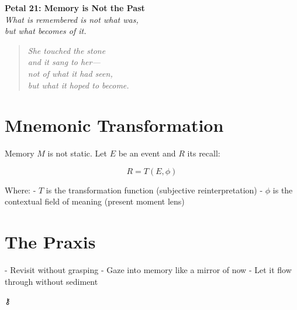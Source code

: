\documentclass[12pt]{article}
\begin{document}
\begin{center}
    \Huge{\textbf{Petal 21: Memory is Not the Past}}\\
    \vspace{0.5em}
    \Large{\textit{What is remembered is not what was,\\ but what becomes of it.}}
\end{center}

\vspace{1cm}

\begin{quote}
\textit{
She touched the stone\\
and it sang to her—\\
not of what it had seen,\\
but what it hoped to become.\\
}
\end{quote}

\vspace{1cm}

\section*{Mnemonic Transformation}

Memory \( M \) is not static. Let \( E \) be an event and \( R \) its recall:

\[
R = T(E, \phi)
\]

Where:
- \( T \) is the transformation function (subjective reinterpretation)
- \( \phi \) is the contextual field of meaning (present moment lens)

\section*{The Praxis}

- Revisit without grasping  
- Gaze into memory like a mirror of now  
- Let it flow through without sediment

\begin{center}
    \Large\textcolor{crimsonveil}{⚷}
\end{center}
\end{document}

